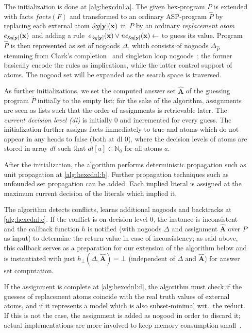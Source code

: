 \documentclass[11pt,fleqn,twoside]{article}
\renewcommand{\vec}[1]{\ensuremath{\mb{#1}}}
\newcommand{\mb}[1]{\ensuremath{\mathbf{#1}}}
\newcommand\hex{{\sc hex}\xspace}
\newcommand{\amp}[1]{\ensuremath{\text{\textsl{{\&}}}\!\mathit{#1}}}
\newcommand{\ext}[3]{\ensuremath{\amp{#1}[#2](#3)}}
\newcommand{\AssignmentP}{\ensuremath{\hat{\mathbf{A}}}}
\newcommand{\Program}{\ensuremath{P}}
\newcommand{\decisionlevel}{\ensuremath{\mathit{dl}}}
\newcommand{\ProgramP}{\ensuremath{\hat{P}}}
\newcommand{\toFacts}[1]{\mathit{facts}(#1)}
\begin{document}
				The initialization is done at \ref{alg:hexcdnl:a}.
				The given \hex-program $\Program$ is extended with facts $\toFacts{F}$
				and transformed to an ordinary ASP-program $\ProgramP$ by replacing each external atom
				$\ext{g}{\vec{y}}{\vec{x}}$ in~$\Program$ by an ordinary \emph{replacement atom} $e_{\amp{g}[\vec{y}]}(\vec{x})$
				and adding a rule~$e_{\amp{g}[\vec{y}]}(\vec{x}) \vee \mathit{ne}_{\amp{g}[\vec{y}]}(\vec{x}) \leftarrow$ to guess its value.
				Program $\ProgramP$ is then represented as set of nogoods $\Delta$, which
				consists of nogoods $\Delta_{\ProgramP}$
				stemming from Clark's completion~\cite{c1977} and singleton loop nogoods~\cite{gks2012-aij};
				the former basically encode the rules as implications, while the latter control support of atoms.
				The nogood set will be expanded as the search space is traversed.

				As further initializations, we set the computed answer set $\AssignmentP$ of the guessing program $\ProgramP$ initially to the empty list;
				for the sake of the algorithm, assignments are seen as lists such that the order of assignments is retrievable later.
				The \emph{current decision level (dl)} is initially $0$ and incremented for every guess.
				The initialization further assigns facts immediately to true and atoms which do not appear in any heads to false (both at dl $0$),
				where the decision levels of atoms are stored in array $\mathit{dl}$ such that $\decisionlevel[a] \in \mathbb{N}_0$ for all atoms $a$.

				After the initialization, the algorithm performs deterministic propagation such as unit propagation at \ref{alg:hexcdnl:b}.
				Further propagation techniques such as unfounded set propagation can be added.
				Each implied literal is assigned at the maximum current decision of the literals which implied it.
				
				The algorithm detects conflicts, learns additional nogoods and backtracks at \ref{alg:hexcdnl:c}.
				If the conflict is on decision level $0$,
				the instance is inconsistent and the callback function $h$ is notified (with nogoods $\Delta$ and assignment $\AssignmentP$ over $\Program$ as input)
				to determine the return value in case of inconsistency; as said above, this callback serves as a preparation for our extension of the algorithm below
				and is instantiated with just $h_{\bot}(\Delta, \AssignmentP) = \bot$ (independent of $\Delta$ and $\AssignmentP$) for answer set computation.
				
				If the assignment is complete at \ref{alg:hexcdnl:d}, the algorithm must check if the guesses of replacement atoms coincide with the
				real truth values of external atoms,
				and if it represents a model which is also subset-minimal wrt.~the reduct.
				If this is not the case, the assignment is added as nogood in order to discard it; actual implementations are more involved to keep memory consumption small~\cite{Drescher08conflict-drivendisjunctive}.
				
\end{document}
